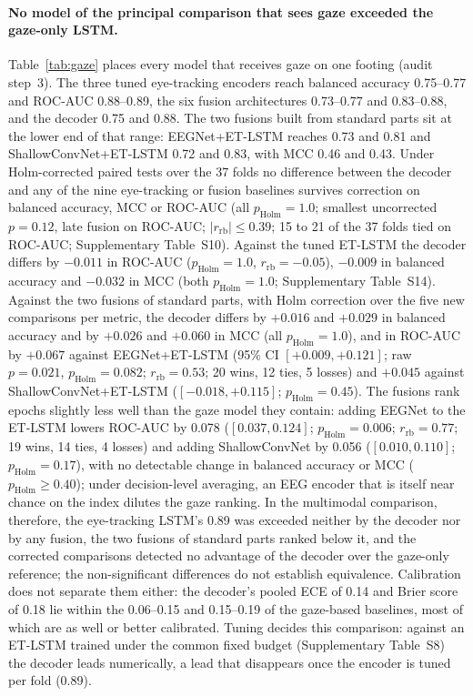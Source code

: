 \paragraph{No model of the principal comparison that sees gaze exceeded the gaze-only LSTM.} Table~\ref{tab:gaze} places every model that receives gaze on one footing (audit step~3). The three tuned eye-tracking encoders reach balanced accuracy 0.75--0.77 and ROC-AUC 0.88--0.89, the six fusion architectures 0.73--0.77 and 0.83--0.88, and the decoder 0.75 and 0.88. The two fusions built from standard parts sit at the lower end of that range: EEGNet+ET-LSTM reaches 0.73 and 0.81 and ShallowConvNet+ET-LSTM 0.72 and 0.83, with MCC 0.46 and 0.43. Under Holm-corrected paired tests over the 37 folds no difference between the decoder and any of the nine eye-tracking or fusion baselines survives correction on balanced accuracy, MCC or ROC-AUC (all $p_{\mathrm{Holm}}=1.0$; smallest uncorrected $p=0.12$, late fusion on ROC-AUC; $|r_{\mathrm{rb}}|\le0.39$; 15 to 21 of the 37 folds tied on ROC-AUC; Supplementary Table~S10). Against the tuned ET-LSTM the decoder differs by $-0.011$ in ROC-AUC ($p_{\mathrm{Holm}}=1.0$, $r_{\mathrm{rb}}=-0.05$), $-0.009$ in balanced accuracy and $-0.032$ in MCC (both $p_{\mathrm{Holm}}=1.0$; Supplementary Table~S14). Against the two fusions of standard parts, with Holm correction over the five new comparisons per metric, the decoder differs by $+0.016$ and $+0.029$ in balanced accuracy and by $+0.026$ and $+0.060$ in MCC (all $p_{\mathrm{Holm}}=1.0$), and in ROC-AUC by $+0.067$ against EEGNet+ET-LSTM (95\% CI $[+0.009, +0.121]$; raw $p=0.021$, $p_{\mathrm{Holm}}=0.082$; $r_{\mathrm{rb}}=0.53$; 20 wins, 12 ties, 5 losses) and $+0.045$ against ShallowConvNet+ET-LSTM ($[-0.018, +0.115]$; $p_{\mathrm{Holm}}=0.45$). The fusions rank epochs slightly less well than the gaze model they contain: adding EEGNet to the ET-LSTM lowers ROC-AUC by 0.078 ($[0.037, 0.124]$; $p_{\mathrm{Holm}}=0.006$; $r_{\mathrm{rb}}=0.77$; 19 wins, 14 ties, 4 losses) and adding ShallowConvNet by 0.056 ($[0.010, 0.110]$; $p_{\mathrm{Holm}}=0.17$), with no detectable change in balanced accuracy or MCC ($p_{\mathrm{Holm}}\ge0.40$); under decision-level averaging, an EEG encoder that is itself near chance on the index dilutes the gaze ranking. In the multimodal comparison, therefore, the eye-tracking LSTM's 0.89 was exceeded neither by the decoder nor by any fusion, the two fusions of standard parts ranked below it, and the corrected comparisons detected no advantage of the decoder over the gaze-only reference; the non-significant differences do not establish equivalence. Calibration does not separate them either: the decoder's pooled ECE of 0.14 and Brier score of 0.18 lie within the 0.06--0.15 and 0.15--0.19 of the gaze-based baselines, most of which are as well or better calibrated. Tuning decides this comparison: against an ET-LSTM trained under the common fixed budget (Supplementary Table~S8) the decoder leads numerically, a lead that disappears once the encoder is tuned per fold (0.89).

